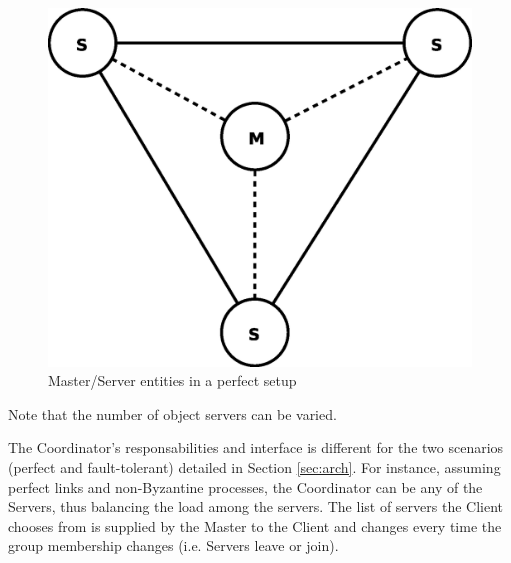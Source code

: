 \documentclass[times, 10pt,twocolumn]{article}
\begin{document}
\begin{figure}
\centering
\includegraphics[scale=0.3]{perfect.eps}
\caption{Master/Server entities in a perfect setup}
\label{fig:perf}
\end{figure}
Note that the number of object servers can be varied.
\label{subsec:recov}

\label{subsec:respon}

The Coordinator's responsabilities and interface is different for the two scenarios (perfect and fault-tolerant) detailed in Section \ref{sec:arch}. For instance, assuming perfect links and non-Byzantine processes, the Coordinator can be any of the Servers, thus balancing the load among the servers. The list of servers the Client chooses from is supplied by the Master to the Client and changes every time the group membership changes (i.e. Servers leave or join). 

\label{sec:algor}
\end{document}
